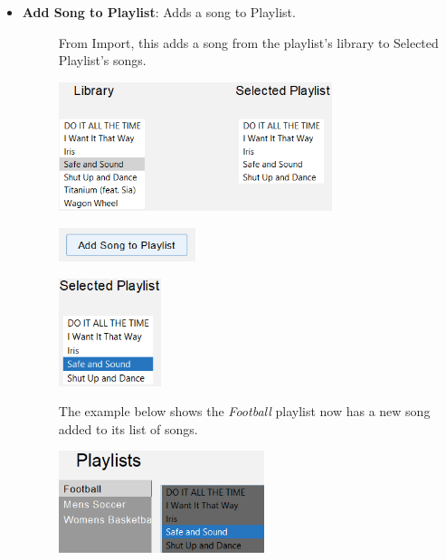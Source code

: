 \documentclass{article}
\begin{document}
\begin{itemize}
    \item \textbf{Add Song to Playlist}: Adds a song to Playlist.
    \begin{description}
        \item[] From Import, this adds a song from the playlist's library to Selected Playlist's songs.
        \item[] \includegraphics[width=8cm]{Images/import_addSongToPlaylist.png}
        \item[] \includegraphics[width=4cm]{Images/import_addSongToPlaylistBtn.png}
        \item[] \includegraphics[width=3cm]{Images/import_SelectedPlaylist_Selected.png}
        \item[] The example below shows the \textit{Football} playlist now has a new song added to its list of songs. 
        \item[] \includegraphics[width=6cm]{Images/InsertedSong.png}
    \end{description}


\end{itemize}
\end{document}
